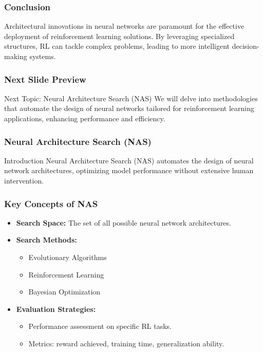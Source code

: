 \documentclass[aspectratio=169]{beamer}
\begin{document}
\begin{frame}[fragile]
    \frametitle{Conclusion}
    Architectural innovations in neural networks are paramount for the effective deployment of reinforcement learning solutions. By leveraging specialized structures, RL can tackle complex problems, leading to more intelligent decision-making systems.
\end{frame}

\begin{frame}[fragile]
    \frametitle{Next Slide Preview}
    \begin{block}{Next Topic: Neural Architecture Search (NAS)}
        We will delve into methodologies that automate the design of neural networks tailored for reinforcement learning applications, enhancing performance and efficiency.
    \end{block}
\end{frame}

\begin{frame}[fragile]
    \frametitle{Neural Architecture Search (NAS)}
    \begin{block}{Introduction}
        Neural Architecture Search (NAS) automates the design of neural network architectures, optimizing model performance without extensive human intervention.
    \end{block}
\end{frame}

\begin{frame}[fragile]
    \frametitle{Key Concepts of NAS}
    \begin{itemize}
        \item \textbf{Search Space:} The set of all possible neural network architectures.
        \item \textbf{Search Methods:}
            \begin{itemize}
                \item Evolutionary Algorithms
                \item Reinforcement Learning
                \item Bayesian Optimization
            \end{itemize}
        \item \textbf{Evaluation Strategies:}
            \begin{itemize}
                \item Performance assessment on specific RL tasks.
                \item Metrics: reward achieved, training time, generalization ability.
            \end{itemize}
    \end{itemize}
\end{frame}
\end{document}
